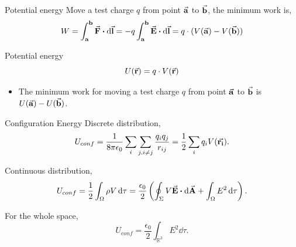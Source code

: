 \documentclass{beamer}
\begin{document}
\begin{frame}{Potential energy}
    Move a test charge $q$ from point $\va{a}$ to $\va{b}$, the minimum work is,
    \begin{equation}
        W = \int_{\vb{a}}^{\vb{b}} \va{F} \vdot \dd{\va{l}} = -q \int_{\vb{a}}^{\vb{b}} \va{E} \vdot \dd{\va{l}} = q \cdot (V(\va{a}) - V(\va{b}))
    \end{equation}

    \begin{block}{Potential energy}
        \begin{equation}
            U(\va{r}) = q \cdot V(\va{r})
        \end{equation}
    \end{block}

    \begin{itemize}
        \item The minimum work for moving a test charge $q$ from point $\va{a}$ to $\va{b}$ is $U(\va{a}) - U(\va{b})$.
    \end{itemize}
\end{frame}


\begin{frame}{Configuration Energy}
    Discrete distribution,
    \begin{equation}
        U_{conf} = \frac{1}{8 \pi \epsilon_0} \sum_{i} \sum_{j, i \neq j} \frac{q_i q_j}{r_{ij}} = \frac{1}{2} \sum_{i} q_i V(\va{r_i}).
    \end{equation}

    Continuous distribution,
    \begin{equation}
        U_{conf} = \frac{1}{2} \int_{\Omega} \rho V \dd{\tau} = \frac{\epsilon_0}{2} \left( \oint_{\Sigma} V \va{E} \vdot \dd{\va{A}} + \int_{\Omega} E^2 \dd{\tau} \right).
    \end{equation}

    For the whole space,
    \begin{equation}
        U_{conf} = \frac{\epsilon_0}{2} \int_{\mathbb{R}^3} E^2 \dd{\tau}.
    \end{equation}
\end{frame}
\end{document}
